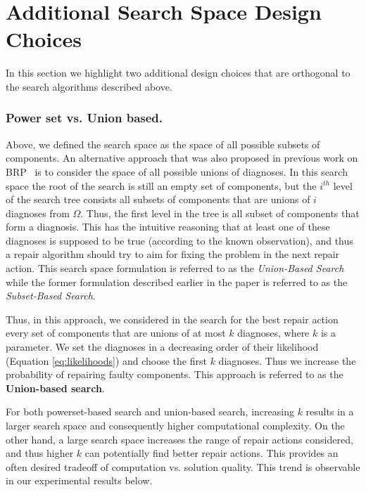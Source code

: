 \documentclass[review]{elsarticle}
\begin{document}
\section{Additional Search Space Design Choices}

In this section we highlight two additional design choices that are orthogonal to the search algorithms described above. 

\subsubsection{Power set vs. Union based.}
Above, we defined the search space as the space of all possible subsets of components. An alternative approach that was also proposed in previous work on BRP~\cite{stern2015implementing} is to consider the space of all possible unions of diagnoses. In this search space the root of the search is still an empty set of components, but the $i^{th}$ level of the search tree consists all subsets of components that are unions of $i$ diagnoses from $\Omega$. Thus, the first level in the tree is all subset of components that form a diagnosis. 
This has the intuitive reasoning that at least one of these diagnoses is supposed to be true (according to the known observation), and thus a repair algorithm should try to aim for fixing the problem in the next repair action. This search space formulation is referred to as the {\em Union-Based Search} while the former formulation described earlier in the paper is referred to as the {\em Subset-Based Search}. 


Thus, in this approach, we considered in the search for the best repair action every set of components that are unions of at most $k$ diagnoses, where $k$ is a parameter. We set the diagnoses in a decreasing order of their likelihood (Equation \ref{eq:likelihoods}) and choose the first $k$ diagnoses. Thus we increase the probability of repairing faulty components. This approach is referred to as the {\bf Union-based search}. %

For both powerset-based search and union-based search, increasing $k$ results in a larger search space and consequently higher computational complexity. On the other hand, a large search space increases the range of repair actions considered, and thus higher $k$ can potentially find better repair actions. This provides an often desired tradeoff of computation vs. solution quality. This trend is observable in our experimental results below.
\end{document}
